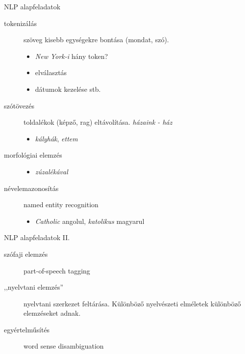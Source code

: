 \documentclass[xcolor=rgb]{beamer}
\begin{document}
\begin{frame}{NLP alapfeladatok}
    \begin{description}
            \pause
        \item[tokenizálás] szöveg kisebb egységekre bontása (mondat, szó).
            \pause
            \begin{itemize}
                \item \emph{New York-i} hány token?
                \item elválasztás
                \item dátumok kezelése stb.
            \end{itemize}
            \pause
        \item[szótövezés] toldalékok (képző, rag) eltávolítása. \emph{házaink - ház}
            \pause
            \begin{itemize}
                \item \emph{kályhák}, \emph{ettem}
            \end{itemize}
        \item[morfológiai elemzés]
            \pause
            \begin{itemize}
                \item \emph{zúzalékával}
            \end{itemize}
        \item[névelemazonosítás] named entity recognition
            \pause
            \begin{itemize}
                \item \emph{Catholic} angolul, \emph{katolikus} magyarul
            \end{itemize}
    \end{description}
\end{frame}

\begin{frame}{NLP alapfeladatok II.}
    \begin{description}
        \item[szófaji elemzés] part-of-speech tagging
        \item[,,nyelvtani elemzés''] nyelvtani szerkezet feltárása. Különböző nyelvészeti elméletek különböző elemzéseket adnak.
        \item[egyértelműsítés] word sense disambiguation
    \end{description}
\end{frame}
\end{document}
